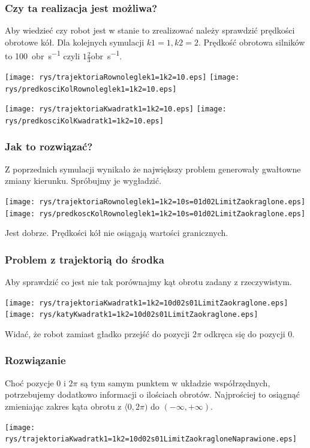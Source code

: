 	\begin{frame}
	\frametitle{Czy ta realizacja jest możliwa?}  
	\tiny
		Aby wiedzieć czy robot jest w stanie to zrealizować należy sprawdzić prędkości obrotowe kół. Dla kolejnych symulacji $k1 = 1, k2 = 2$. Prędkość obrotowa silników to \SI{100}{obr\per\second} czyli $1\frac{2}{3}$\si{obr\per\second}.
		\begin{center}
			\texttt{[image: rys/trajektoriaRownoleglek1=1k2=10.eps]}
			\texttt{[image: rys/predkosciKolRownoleglek1=1k2=10.eps]}  
		\end{center}
	\begin{center}
		\texttt{[image: rys/trajektoriaKwadratk1=1k2=10.eps]}
		\texttt{[image: rys/predkosciKolKwadratk1=1k2=10.eps]}
	\end{center}
	\end{frame}

	\begin{frame}
	\frametitle{Jak to rozwiązać?}  
		Z poprzednich symulacji wynikało że największy problem generowały gwałtowne zmiany kierunku. Spróbujmy je wygładzić.
		\begin{center}
			\texttt{[image: rys/trajektoriaRownoleglek1=1k2=10s=01d02LimitZaokraglone.eps]}
			\texttt{[image: rys/predkoscKolRownoleglek1=1k2=10s=01d02LimitZaokraglone.eps]}
		\end{center}
		Jest dobrze. Prędkości kół nie osiągają wartości granicznych.
	\end{frame}

	\begin{frame}
	\frametitle{Problem z trajektorią do środka}  
		Aby sprawdzić co jest nie tak porównajmy kąt obrotu zadany z rzeczywistym.
		\begin{center}
			\texttt{[image: rys/trajektoriaKwadratk1=1k2=10d02s01LimitZaokraglone.eps]}
			\texttt{[image: rys/katyKwadratk1=1k2=10d02s01LimitZaokraglone.eps]} 
		\end{center}
		Widać, że robot zamiast gładko przejść do pozycji $2\pi$ odkręca się do pozycji $0$.
	\end{frame}

	\begin{frame}
	\frametitle{Rozwiązanie}  
		Choć pozycje $0$ i $2\pi$ są tym samym punktem w układzie współrzędnych, potrzebujemy dodatkowo informacji o ilościach obrotów. Najprościej to osiągnąć zmieniając zakres kąta obrotu z $\langle 0, 2\pi)$ do $(-\infty, +\infty)$.
		\begin{center}
			\texttt{[image: rys/trajektoriaKwadratk1=1k2=10d02s01LimitZaokragloneNaprawione.eps]} 
		\end{center}
	\end{frame}

